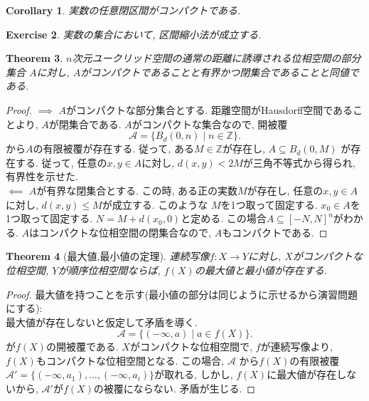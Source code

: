 \documentclass[lualatex]{ltjsbook}
\newtheorem{theorem}{Theorem}[section]
\newtheorem{corollary}[theorem]{Corollary}
\theoremstyle{remark}
\theoremstyle{plain}
\newtheorem{exercise}[theorem]{Exercise}
\begin{document}
\begin{corollary}
	実数の任意閉区間がコンパクトである.
\end{corollary}

\begin{exercise}
	実数の集合において, 区間縮小法が成立する.
\end{exercise}


\begin{theorem}
	$n$次元ユークリッド空間の通常の距離に誘導される位相空間の部分集合 $A$に対し,  $A$がコンパクトであることと有界かつ閉集合であることと同値である.
\end{theorem}

\begin{proof}
	$\implies$ $A$がコンパクトな部分集合とする. 距離空間がHausdorff空間であることより,  $A$が閉集合である.   $A$がコンパクトな集合なので, 開被覆
	 \[
	 \mathcal{A}= \{ B_d \left( 0, n \right)  \mid  n \in \mathbb{Z}\} 
	 .\]
	 から$A$の有限被覆が存在する. 従って, ある$M \in \mathbb{Z}$が存在し, $A \subseteq  B_d\left( 0,M \right) $ が存在する. 従って, 任意の$x,y \in A$に対し,  $d(x,y) < 2M$が三角不等式から得られ, 有界性を示せた.\\
	 $\impliedby$ $A$が有界な閉集合とする. この時, ある正の実数$M$が存在し,  任意の$x, y \in A$に対し,  $d(x,y) \le M$が成立する. このような $M$を1つ取って固定する. $x_0 \in A$を1つ取って固定する.
	 $N = M + d(x_0, 0)$と定める. この場合$A \subseteq [-N, N]^n$がわかる. 
	 $A$はコンパクトな位相空間の閉集合なので,  $A$もコンパクトである.
\end{proof}

\begin{theorem}[最大値,最小値の定理]
	連続写像$f : X \to Y$に対し, $X$がコンパクトな位相空間,  $Y$が順序位相空間ならば,  $f(X)$の最大値と最小値が存在する.
\end{theorem}

\begin{proof}
	最大値を持つことを示す(最小値の部分は同じように示せるから演習問題にする):\\
	最大値が存在しないと仮定して矛盾を導く. 
	\[
	\mathcal{A} = \{ (- \infty ,a )  \mid  a \in f(X)\} 
	.\] 
	が$f(X)$の開被覆である.  $X$がコンパクトな位相空間で,  $f$が連続写像より,  $f(X)$もコンパクトな位相空間となる.
	この場合,  $\mathcal{A}$ から$f(X)$の有限被覆$\mathcal{A}' = \{ (-\infty, a_1) , \ldots ,(-\infty,a_i)\} $が取れる, しかし,  $f(X)$に最大値が存在しないから,  $\mathcal{A}'$が$f(X)$の被覆にならない. 矛盾が生じる.

\end{proof}
\end{document}
